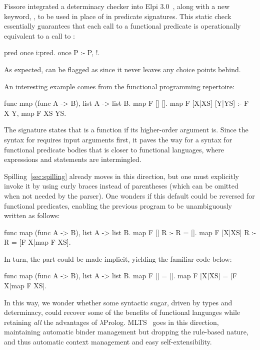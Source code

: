 \documentclass[a4paper, 11pt]{book}
\begin{document}
Fissore
integrated a determinacy checker into Elpi 3.0~\cite{elpidet}, along with a new
keyword, , to be used in place of  in predicate
signatures. This static check essentially guarantees that each call to a
functional predicate  is operationally equivalent to a call to
:

\begin{elpicode}
pred once i:pred.
once P :- P, !.
\end{elpicode}

\noindent As expected,  can be flagged as  since it never
leaves any choice points behind.

An interesting example comes from the functional programming repertoire:
\begin{elpicode}
func map (func A -> B), list A -> list B.
map F [] [].
map F [X|XS] [Y|YS] :- F X Y, map F XS YS.
\end{elpicode}

\noindent The signature states that  is a function if its
higher-order argument  is. Since the syntax for  requires
input arguments first, it paves the way for a syntax for functional predicate
bodies that is closer to functional languages, where expressions and statements
are intermingled.

Spilling~\cref{sec:spilling} already moves in this direction, but one must
explicitly invoke it by using curly braces instead of parentheses (which can be
omitted when not needed by the parser). One wonders if this default could be
reversed for functional predicates, enabling the previous program to be
unambiguously written as follows:

\begin{elpicode}
func map (func A -> B), list A -> list B.
map F [] R :- R = [].
map F [X|XS] R :- R = [F X|map F XS].
\end{elpicode}

\noindent
In turn, the  part could be made implicit, yielding the familiar
code below:

\begin{elpicode}
func map (func A -> B), list A -> list B.
map F [] = [].
map F [X|XS] = [F X|map F XS].
\end{elpicode}

\noindent In this way, we
wonder whether some syntactic sugar, driven by types and determinacy, could
recover some of the benefits of functional languages while retaining \emph{all}
the advantages of $\lambda$Prolog. MLTS~\cite{mlts} goes in this direction,
maintaining automatic binder management but dropping the rule-based nature, and
thus automatic context management and easy self-extensibility.
\end{document}
